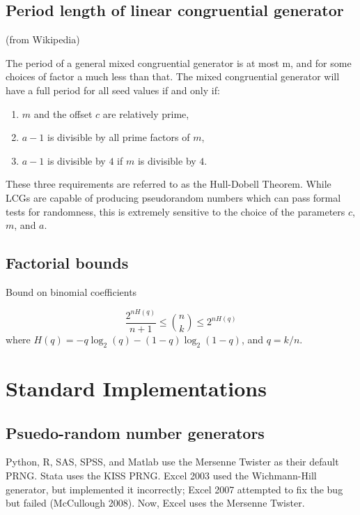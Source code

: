 \documentclass[12pt]{article}
\begin{document}
\subsection{Period length of linear congruential generator}
(from Wikipedia)

The period of a general mixed congruential generator is at most m, and for some choices of factor a much less than that. The mixed congruential generator will have a full period for all seed values if and only if:

\begin{enumerate}
\item $m$ and the offset $c$ are relatively prime,
\item $a-1$ is divisible by all prime factors of $m$,
\item $a-1$ is divisible by $4$ if $m$ is divisible by $4$.
\end{enumerate}

These three requirements are referred to as the Hull-Dobell Theorem.
While LCGs are capable of producing pseudorandom numbers which can pass formal tests for randomness, this is extremely sensitive to the choice of the parameters $c$, $m$, and $a$.

\subsection{Factorial bounds}

Bound on binomial coefficients

$$ \frac{2^{nH(q)}}{n+1} \leq {n \choose k} \leq 2^{nH(q)}$$
where $H(q) = -q \log_2(q) - (1-q)\log_2(1-q)$, and $q = k/n$.


\section{Standard Implementations}
\subsection{Psuedo-random number generators}
Python, R, SAS, SPSS, and Matlab use the Mersenne Twister as their default PRNG.
Stata uses the KISS PRNG.
Excel 2003 used the Wichmann-Hill generator, but implemented it incorrectly; Excel 2007 attempted to fix the bug but failed (McCullough 2008).
Now, Excel uses the Mersenne Twister.
\end{document}
